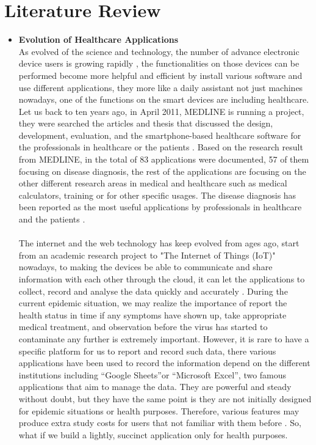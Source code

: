 \documentclass[12pt]{article}
\begin{document}
\section{Literature Review}
\begin{itemize}
\item\textbf{Evolution of Healthcare Applications}
\\As evolved of the science and technology, the number of advance electronic device users is growing rapidly \cite{charland2011mobile}, the functionalities on those devices can be performed become more helpful and efficient by install various software and use different applications, they more like a daily assistant not just machines nowadays, one of the functions on the smart devices are including healthcare. Let us back to ten years ago, in April 2011, MEDLINE is running a project, they were searched the articles and thesis that discussed the design, development, evaluation, and the smartphone-based healthcare software for the professionals in healthcare or the patients \cite{mosa2012systematic}. Based on the research result from MEDLINE, in the total of 83 applications were documented, 57 of them focusing on disease diagnosis, the rest of the applications are focusing on the other different research areas in medical and healthcare such as medical calculators, training or for other specific usages. The disease diagnosis has been reported as the most useful applications by professionals in healthcare and the patients \cite{mosa2012systematic}.
\\
\\The internet and the web technology has keep evolved from ages ago, start from an academic research project to "The Internet of Things (IoT)" nowadays, to making the devices be able to communicate and share information with each other through the cloud, it can let the applications to collect, record and analyse the data quickly and accurately \cite{kulkarni2014healthcare}. During the current epidemic situation, we may realize the importance of report the health status in time if any symptoms have shown up, take appropriate medical treatment, and observation before the virus has started to contaminate any further is extremely important. However, it is rare to have a specific platform for us to report and record such data, there various applications have been used to record the information depend on the different institutions including ``Google Sheets''or ``Microsoft Excel'', two famous applications that aim to manage the data. They are powerful and steady without doubt, but they have the same point is they are not initially designed for epidemic situations or health purposes. Therefore, various features may produce extra study costs for users that not familiar with them before \cite{vora2009web}. So, what if we build a lightly, succinct application only for health purposes.

\end{itemize}
\end{document}
